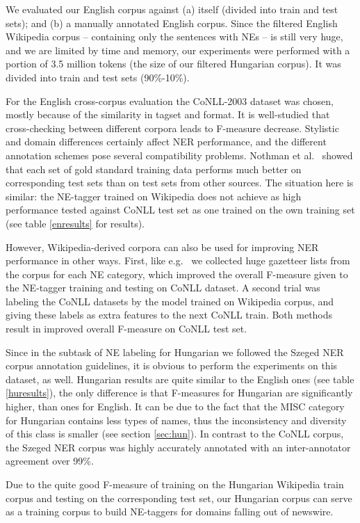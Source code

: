 \documentclass[11pt]{article}
\begin{document}
We evaluated our English corpus against (a) itself (divided into train and test sets); and (b) a manually annotated English corpus. Since the filtered English Wikipedia corpus -- containing only the sentences with NEs -- is still very huge, and we are limited by time and memory, our experiments were performed with a portion of 3.5 million tokens (the size of our filtered Hungarian corpus). It was divided into train and test sets (90\%-10\%). 

For the English cross-corpus evaluation the CoNLL-2003 dataset was chosen, mostly because of the similarity in tagset and format. It is well-studied that cross-checking between different corpora leads to F-measure decrease. Stylistic and domain differences certainly affect NER performance, and the different annotation schemes pose several compatibility problems. Nothman et al.~ showed that each set of gold standard training data performs much better on corresponding test sets than on test sets from other sources. The situation here is similar: the NE-tagger trained on Wikipedia does not achieve as high performance tested against CoNLL test set as one trained on the own training set (see table \ref{enresults} for results). 

However, Wikipedia-derived corpora can also be used for improving NER performance in other ways. First, like e.g.~\cite{Toral:06} we collected huge gazetteer lists from the corpus for each NE category, which improved the overall F-measure given to the NE-tagger training and testing on CoNLL dataset. A second trial was labeling the CoNLL datasets by the model trained on Wikipedia corpus, and giving these labels as extra features to the next CoNLL train. Both methods result in improved overall F-measure on CoNLL test set.  

Since in the subtask of NE labeling for Hungarian we followed the Szeged NER corpus annotation guidelines, it is obvious to perform the experiments on this dataset, as well. Hungarian results are quite similar to the English ones (see table \ref{huresults}), the only difference is that F-measures for Hungarian are significantly higher, than ones for English. It can be due to the fact that the MISC category for Hungarian contains less types of names, thus the inconsistency and diversity of this class is smaller (see section \ref{sec:hun}). In contrast to the CoNLL corpus, the Szeged NER corpus was highly accurately annotated with an inter-annotator agreement over 99\%.  

Due to the quite good F-measure of training on the Hungarian Wikipedia train corpus and testing on the corresponding test set, our Hungarian corpus can serve as a training corpus to build NE-taggers for domains falling out of newswire. 
\end{document}
